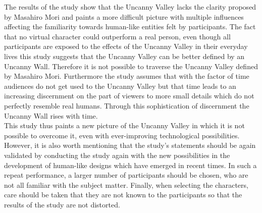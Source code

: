The results of the study show that the Uncanny Valley lacks the clarity proposed by Masahiro Mori and paints a more difficult picture with multiple influences affecting the familiarity towards human-like entities felt by participants. The fact that no virtual character could outperform a real person, even though all participants are exposed to the effects of the Uncanny Valley in their everyday lives this study suggests that the Uncanny Valley can be better defined by an Uncanny Wall. Therefore it is not possible to traverse the Uncanny Valley defined by Masahiro Mori. Furthermore the study assumes that with the factor of time audiences do not get used to the Uncanny Valley but that time leads to an increasing discernment on the part of viewers to more small details which do not perfectly resemble real humans. Through this sophistication of discernment the Uncanny Wall rises with time. \cite{uncanny_wall}\\
This study thus paints a new picture of the Uncanny Valley in which it is not possible to overcome it, even with ever-improving technological possibilities. However, it is also worth mentioning that the study's statements should be again validated by conducting the study again with the new possibilities in the development of human-like designs which have emerged in recent times. In such a repeat performance, a larger number of participants should be chosen, who are not all familiar with the subject matter. Finally, when selecting the characters, care should be taken that they are not known to the participants so that the results of the study are not distorted. 








